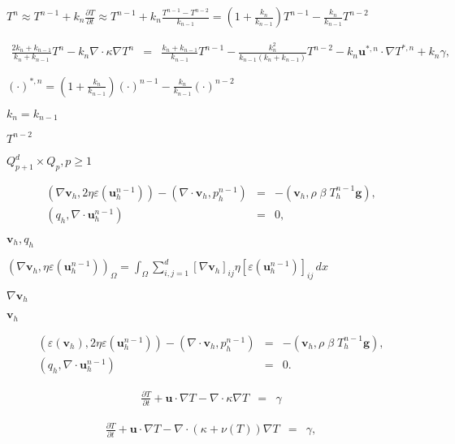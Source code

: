 \documentclass{article}
\begin{document}
$T^n \approx T^{n-1} + k_n \frac{\partial T}{\partial t} \approx T^{n-1} + k_n \frac{T^{n-1}-T^{n-2}}{k_{n-1}} = \left(1+\frac{k_n}{k_{n-1}}\right)T^{n-1}-\frac{k_n}{k_{n-1}}T^{n-2}$
\pagebreak

\begin{eqnarray*} \frac{2k_n+k_{n-1}}{k_n+k_{n-1}} T^n - k_n\nabla \cdot \kappa \nabla T^n &=& \frac{k_n+k_{n-1}}{k_{n-1}} T^{n-1} - \frac{k_n^2}{k_{n-1}(k_n+k_{n-1})} T^{n-2} - k_n{\mathbf u}^{*,n} \cdot \nabla T^{*,n} + k_n\gamma, \end{eqnarray*}
\pagebreak

${(\cdot)}^{*,n} = \left(1+\frac{k_n}{k_{n-1}}\right)(\cdot)^{n-1} - \frac{k_n}{k_{n-1}}(\cdot)^{n-2}$
\pagebreak

$k_n=k_{n-1}$
\pagebreak

$T^{n-2}$
\pagebreak

$Q_{p+1}^d \times Q_p, p\ge 1$
\pagebreak

\begin{eqnarray*} (\nabla {\mathbf v}_h, 2\eta \varepsilon ({\mathbf u}^{n-1}_h)) - (\nabla \cdot {\mathbf v}_h, p^{n-1}_h) &=& -({\mathbf v}_h, \rho\; \beta \; T^{n-1}_h \mathbf{g}), \\ (q_h, \nabla \cdot {\mathbf u}^{n-1}_h) &=& 0, \end{eqnarray*}
\pagebreak

$\mathbf v_h, q_h$
\pagebreak

$(\nabla {\mathbf v}_h, \eta \varepsilon ({\mathbf u}^{n-1}_h))_\Omega = \int_\Omega \sum_{i,j=1}^d [\nabla {\mathbf v}_h]_{ij} \eta [\varepsilon ({\mathbf u}^{n-1}_h)]_{ij}\, dx$
\pagebreak

$\nabla {\mathbf v}_h$
\pagebreak

$\mathbf v_h$
\pagebreak

\begin{eqnarray*} (\varepsilon({\mathbf v}_h), 2\eta \varepsilon ({\mathbf u}^{n-1}_h)) - (\nabla \cdot {\mathbf v}_h, p^{n-1}_h) &=& -({\mathbf v}_h, \rho\; \beta \; T^{n-1}_h \mathbf{g}), \\ (q_h, \nabla \cdot {\mathbf u}^{n-1}_h) &=& 0. \end{eqnarray*}
\pagebreak

\begin{eqnarray*} \frac{\partial T}{\partial t} + {\mathbf u} \cdot \nabla T - \nabla \cdot \kappa \nabla T &=& \gamma \end{eqnarray*}
\pagebreak

\begin{eqnarray*} \frac{\partial T}{\partial t} + {\mathbf u} \cdot \nabla T - \nabla \cdot (\kappa+\nu(T)) \nabla T &=& \gamma, \end{eqnarray*}
\pagebreak
\end{document}

